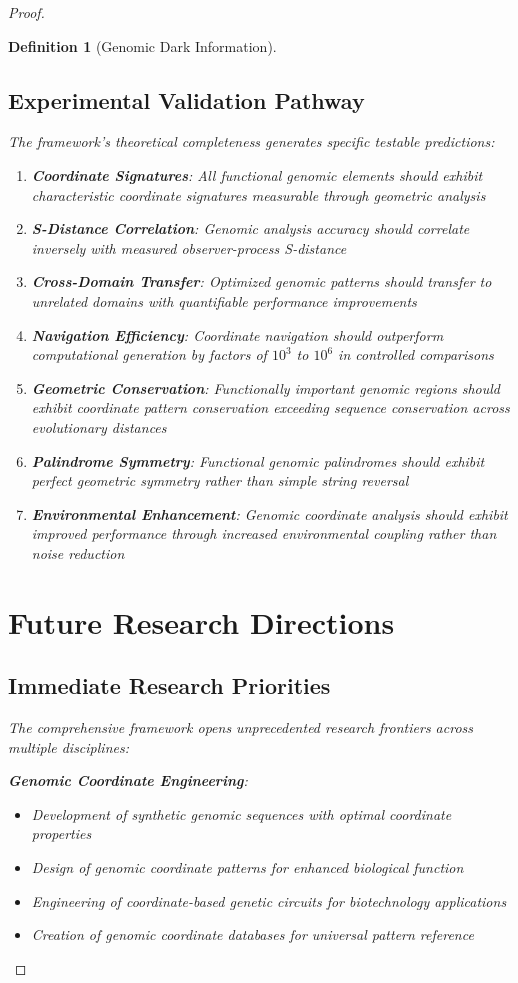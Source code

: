 \documentclass[12pt,a4paper]{article}
\newtheorem{definition}{Definition}
\begin{document}
\begin{proof}
\begin{definition}[Genomic Dark Information]
\begin{algorithm}[H]
\subsection{Experimental Validation Pathway}

The framework's theoretical completeness generates specific testable predictions:

\begin{enumerate}
\item \textbf{Coordinate Signatures}: All functional genomic elements should exhibit characteristic coordinate signatures measurable through geometric analysis
\item \textbf{S-Distance Correlation}: Genomic analysis accuracy should correlate inversely with measured observer-process S-distance
\item \textbf{Cross-Domain Transfer}: Optimized genomic patterns should transfer to unrelated domains with quantifiable performance improvements
\item \textbf{Navigation Efficiency}: Coordinate navigation should outperform computational generation by factors of $10^3$ to $10^6$ in controlled comparisons
\item \textbf{Geometric Conservation}: Functionally important genomic regions should exhibit coordinate pattern conservation exceeding sequence conservation across evolutionary distances
\item \textbf{Palindrome Symmetry}: Functional genomic palindromes should exhibit perfect geometric symmetry rather than simple string reversal
\item \textbf{Environmental Enhancement}: Genomic coordinate analysis should exhibit improved performance through increased environmental coupling rather than noise reduction
\end{enumerate}

\section{Future Research Directions}

\subsection{Immediate Research Priorities}

The comprehensive framework opens unprecedented research frontiers across multiple disciplines:

\textbf{Genomic Coordinate Engineering}:
\begin{itemize}
\item Development of synthetic genomic sequences with optimal coordinate properties
\item Design of genomic coordinate patterns for enhanced biological function
\item Engineering of coordinate-based genetic circuits for biotechnology applications
\item Creation of genomic coordinate databases for universal pattern reference
\end{itemize}


\end{algorithm}
\end{definition}
\end{proof}
\end{document}
